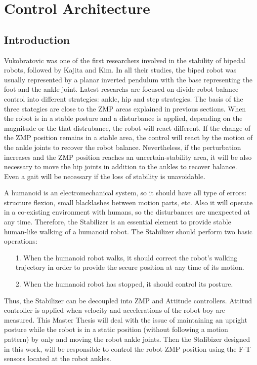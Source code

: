 \chapter{Control Architecture}
\section{Introduction}
Vukobratovic \cite{Vuk1970} was one of the first researchers involved in the stability of bipedal robots, followed by Kajita \cite{Kaj2001} and Kim\cite{Kim2004}. In all their studies, the biped robot was usually represented by a planar inverted pendulum with the base representing the foot and the ankle joint. 
Latest researchs are focused on divide robot balance control into different strategies: ankle, hip and step strategies. The basis of the three stategies are close to the ZMP areas explained in previous sections. When the robot is in a stable posture and a disturbance is applied, depending on the magnitude or the that distrubance, the robot will react different. If the change of the ZMP position remains in a stable area, the control will react by the motion of the ankle joints to recover the robot balance. Nevertheless, if the perturbation increases and the ZMP position reaches an uncertain-stability area, it will be also necessary to move the hip joints in addition to the ankles to recover balance. Even a gait will be necessary if the loss of stability is unavoidable. 

A humanoid is an electromechanical system, so it should have all type of errors: structure flexion, small blacklashes between motion parts, etc. Also it will operate in a co-existing environment with humans, so the disturbances are unexpected at any time. Therefore, the Stabilizer is an essential element to provide stable human-like walking of a humanoid robot. The Stabilizer should perform two basic operations:
\begin{itemize}
\item[1.] When the humanoid robot walks, it should correct the robot’s walking trajectory in order to provide the secure position at any time of its motion.
\item[2.] When the humanoid robot has stopped, it should control its posture.
\end{itemize}

Thus, the Stabilizer can be decoupled into ZMP and Attitude controllers. Attitud controller is applied when velocity and accelerations of the robot boy are measured. This Master Thesis will deal with the issue of maintaining an upright posture while the robot is in a static position (without following a motion pattern) by only and moving the robot ankle joints. Then the Stalibizer designed in this work, will be responsible to control the robot ZMP position using the F-T sensors located at the robot ankles.







